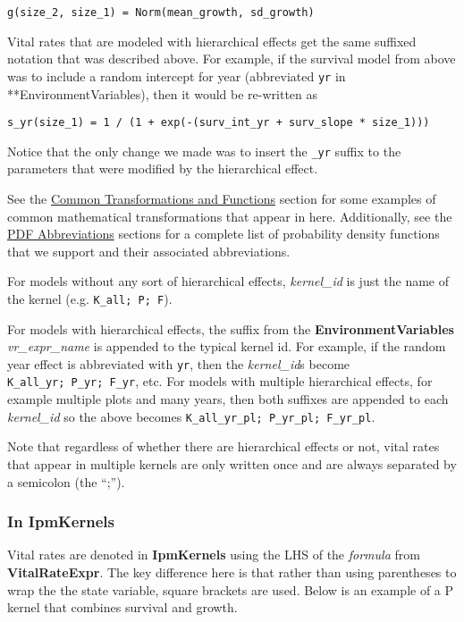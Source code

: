 \documentclass[]{article}
\begin{document}
\texttt{g(size\_2,\ size\_1)\ =\ Norm(mean\_growth,\ sd\_growth)}

Vital rates that are modeled with hierarchical effects get the same
suffixed notation that was described above. For example, if the survival
model from above was to include a random intercept for year (abbreviated
\texttt{yr} in **EnvironmentVariables), then it would be re-written as

\texttt{s\_yr(size\_1)\ =\ 1\ /\ (1\ +\ exp(-(surv\_int\_yr\ +\ surv\_slope\ *\ size\_1)))}

Notice that the only change we made was to insert the \texttt{\_yr}
suffix to the parameters that were modified by the hierarchical effect.

See the \protect\hyperlink{transforms-funs}{Common Transformations and
Functions} section for some examples of common mathematical
transformations that appear in here. Additionally, see the
\protect\hyperlink{pdf-abbrev}{PDF Abbreviations} sections for a
complete list of probability density functions that we support and their
associated abbreviations.

For models without any sort of hierarchical effects, \emph{kernel\_id}
is just the name of the kernel (e.g. \texttt{K\_all;\ P;\ F}).

For models with hierarchical effects, the suffix from the
\textbf{EnvironmentVariables} \emph{vr\_expr\_name} is appended to the
typical kernel id. For example, if the random year effect is abbreviated
with \texttt{yr}, then the \emph{kernel\_id}s become
\texttt{K\_all\_yr;\ P\_yr;\ F\_yr}, etc. For models with multiple
hierarchical effects, for example multiple plots and many years, then
both suffixes are appended to each \emph{kernel\_id} so the above
becomes \texttt{K\_all\_yr\_pl;\ P\_yr\_pl;\ F\_yr\_pl}.

Note that regardless of whether there are hierarchical effects or not,
vital rates that appear in multiple kernels are only written once and
are always separated by a semicolon (the ``;'').

\subsubsection{In IpmKernels}\label{in-ipmkernels}

Vital rates are denoted in \textbf{IpmKernels} using the LHS of the
\emph{formula} from \textbf{VitalRateExpr}. The key difference here is
that rather than using parentheses to wrap the the state variable,
square brackets are used. Below is an example of a P kernel that
combines survival and growth.
\end{document}
